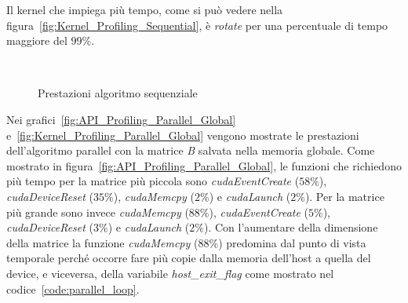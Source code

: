 Il kernel che impiega più tempo, come si può vedere nella figura~\ref{fig:Kernel_Profiling_Sequential}, è \textit{rotate} per una percentuale di tempo maggiore del $99\%$.
\begin{figure}[H]
	\centering
	 \\
	\caption{Prestazioni algoritmo sequenziale}
\end{figure}

Nei grafici~\ref{fig:API_Profiling_Parallel_Global} e~\ref{fig:Kernel_Profiling_Parallel_Global} vengono mostrate le prestazioni dell'algoritmo parallel con la matrice \textit{B} salvata nella memoria globale. Come mostrato in figura~\ref{fig:API_Profiling_Parallel_Global}, le funzioni che richiedono più tempo per la matrice più piccola sono \textit{cudaEventCreate} ($58\%$), \textit{cudaDeviceReset} ($35\%$), \textit{cudaMemcpy} ($2\%$) e \textit{cudaLaunch} ($2\%$). Per la matrice più grande sono invece \textit{cudaMemcpy} ($88\%$), \textit{cudaEventCreate} ($5\%$), \textit{cudaDeviceReset} ($3\%$) e \textit{cudaLaunch} ($2\%$). Con l'aumentare della dimensione della matrice la funzione \textit{cudaMemcpy} ($88\%$) predomina dal punto di vista temporale perché occorre fare più copie dalla memoria dell'host a quella del device, e viceversa, della variabile \textit{host\_exit\_flag} come mostrato nel codice~\ref{code:parallel_loop}. 

